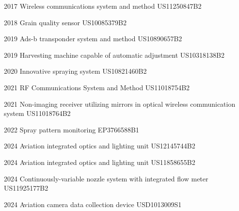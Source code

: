 \begin{cvpatents}
  \cvpatent
    {2017} %
    {Wireless communications system and method} %
    {US11250847B2} %

  \cvpatent
    {2018} %
    {Grain quality sensor} %
    {US10085379B2} %

  \cvpatent
    {2019} %
    {Ads-b transponder system and method} %
    {US10890657B2} %

  \cvpatent
    {2019} %
    {Harvesting machine capable of automatic adjustment} %
    {US10318138B2} %

  \cvpatent
    {2020} %
    {Innovative spraying system} %
    {US10821460B2} %

  \cvpatent
    {2021} %
    {RF Communications System and Method} %
    {US11018754B2} %

  \cvpatent
    {2021} %
    {Non-imaging receiver utilizing mirrors in optical wireless communication system} %
    {US11018764B2} %

  \cvpatent
    {2022} %
    {Spray pattern monitoring} %
    {EP3766588B1} %

  \cvpatent
    {2024} %
    {Aviation integrated optics and lighting unit} %
    {US12145744B2} %

\cvpatent
    {2024} %
    {Aviation integrated optics and lighting unit} %
    {US11858655B2} %

\cvpatent
    {2024} %
    {Continuously-variable nozzle system with integrated flow meter} %
    {US11925177B2} %

  \cvpatent
    {2024} %
    {Aviation camera data collection device} %
    {USD1013009S1} %

  \end{cvpatents}

